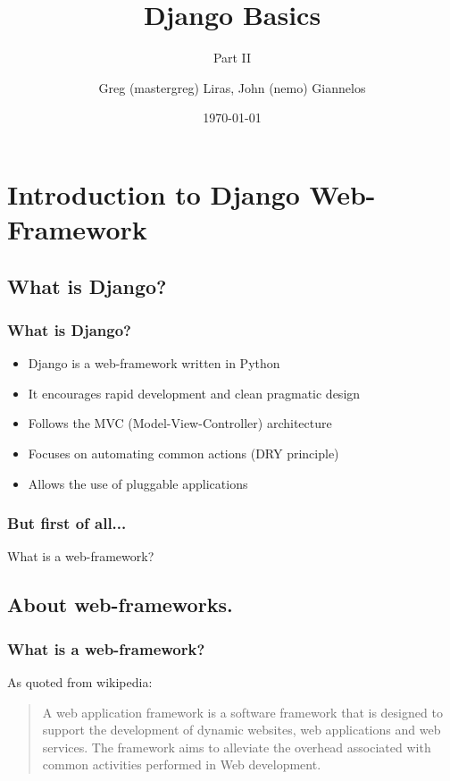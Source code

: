 \documentclass{beamer}
\author[nemo/mastergreg]{Greg (mastergreg) Liras, John (nemo) Giannelos}
\institute{FOSS NTUA}
\title{Django Basics}
\subtitle{Part II}
\date{\today}
\begin{document}
\begin{frame}
\titlepage
\end{frame}


\section{Introduction to Django Web-Framework}

\subsection{What is Django?}
\begin{frame}
  \frametitle{What is Django?}
\begin{itemize}[<+->]
  \item Django is a web-framework written in Python 
  \item It encourages rapid development and clean pragmatic design 
  \item Follows the MVC (Model-View-Controller) architecture
  \item Focuses on automating common actions (DRY principle) 
  \item Allows the use of pluggable applications
\end{itemize}
\end{frame}

\begin{frame}
  \frametitle{But first of all...}
What is a web-framework?
\end{frame}

\subsection{About web-frameworks.}

\begin{frame}
  \frametitle{What is a web-framework?}
As quoted from wikipedia:
\begin{quote}
A web application framework is a software framework that is designed to support the development of dynamic websites, web applications and web services. The framework aims to alleviate the overhead associated with common activities performed in Web development.
\end{quote}
\end{frame}
\end{document}
